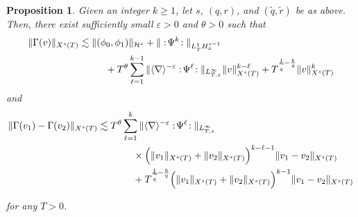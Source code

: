 \documentclass[letterpaper, 11pt,  reqno]{amsart}
\newtheorem{proposition}[theorem]{Proposition}
\newcommand{\1}{\hspace{0.5mm}\text{I}\hspace{0.5mm}}
\newcommand{\noi}{\noindent}
\newcommand{\nb}{\nabla}
\newcommand{\eps}{\varepsilon}
\newcommand{\G}{\Gamma}
\newcommand{\wt}{\widetilde}
\renewcommand{\l}{\ell}
\newcommand{\les}{\lesssim}
\newcommand{\jb}[1]
{\langle #1 \rangle}
\renewcommand{\H}{\mathcal{H}}
\numberwithin{equation}{section}
\numberwithin{theorem}{section}
\begin{document}
\begin{proposition}\label{PROP:nonlin} 
Given an integer $k \geq 1$, let $s$, $(q, r)$, and $(\wt q, \wt r)$ be as above.
Then,  there exist sufficiently small $\eps >0$ and $\theta > 0$ such that 
\begin{align} 
\| \G(v) \|_{X^s(T)} 
& \les
\|(\phi_0, \phi_1)\|_{\H^s}
+ \| :\!\Psi^k\!: \|_{L^1_TH^{s-1}_x} \notag\\
& \hphantom{XXX}+   T^\theta \sum_{\l=1}^{k-1} \|\jb{\nb}^{-\eps} :\!\Psi^\l\!: \|_{L^\infty_{T, x}} 
\| v \|_{X^s(T)}^{k-\l}  
 +  T^{\frac{1}{\wt q}-\frac kq} 
\| v \|_{X^s(T)}^k   
\label{J3a}
\end{align}
and 
\begin{align}
\| \G(v_1)-\G(v_2)  \|_{X^s(T)} & \les  
T^\theta \sum_{\l=1}^k \|\jb{\nb}^{-\eps} :\!\Psi^\l\!: \|_{L^\infty_{T, x}} \notag\\
& \hphantom{XXXX}
\times
\Big( \| v_1 \|_{X^s(T)}  + \| v_2 \|_{X^s(T)}\Big)^{k-\l-1}  
\| v_1 - v_2 \|_{X^s(T)}   \notag\\ 
  & \hphantom{XXXX}
  +  T^{\frac{1}{\wt q}-\frac k q} 
\Big( \| v_1 \|_{X^s(T)}+ \| v_2 \|_{X^s(T)}\Big)^{k-1} \| v_1-v_2 \|_{X^s(T)}
\label{J3b}
\end{align}

\noi
for any $T > 0$.

\end{proposition} 
\end{document}
